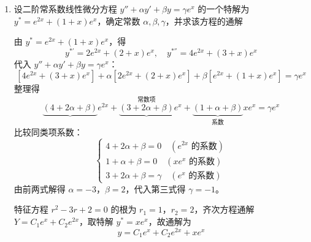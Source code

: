 \documentclass[../book.tex]{subfiles}
\begin{document}
    \begin{enumerate}
        \item 设二阶常系数线性微分方程 $y'' + \alpha y' + \beta y = \gamma e^x$ 的一个特解为 $y^* = e^{2x} + (1+x)e^x$，确定常数 $\alpha, \beta, \gamma$，并求该方程的通解
        \begin{analysisbox}[解]
            由 $y^* = e^{2x} + (1+x)e^x$，得
            \[
                y^{*'} = 2e^{2x} + (2+x)e^x, \quad y^{*''} = 4e^{2x} + (3+x)e^x
            \]
            代入 $y'' + \alpha y' + \beta y = \gamma e^x$：
            \[
                [4e^{2x} + (3+x)e^x] + \alpha[2e^{2x} + (2+x)e^x] + \beta[e^{2x} + (1+x)e^x] = \gamma e^x
            \]
            整理得
            \[
                \underbrace{(4 + 2\alpha + \beta)}_{} e^{2x} + \underbrace{(3 + 2\alpha + \beta)}^{\text{常数项}} e^x + \underbrace{(1 + \alpha + \beta)}_{\text{系数}} x e^x = \gamma e^x
            \]
            比较同类项系数：
            \[
                \begin{cases}
                    4 + 2\alpha + \beta = 0 \quad (e^{2x}\text{ 的系数}) \\
                    1 + \alpha + \beta = 0 \quad (xe^x\text{ 的系数}) \\
                    3 + 2\alpha + \beta = \gamma \quad (e^x\text{ 的系数})
                \end{cases}
            \]
            由前两式解得 $\alpha = -3$，$\beta = 2$，代入第三式得 $\gamma = -1$。

            特征方程 $r^2 - 3r + 2 = 0$ 的根为 $r_1 = 1$，$r_2 = 2$，齐次方程通解 $Y = C_1 e^x + C_2 e^{2x}$，取特解 $y^* = xe^x$，故通解为
            \[
                \boxed{y = C_1 e^x + C_2 e^{2x} + xe^x}
            \]
        \end{analysisbox}
    \end{enumerate}
\end{document}
